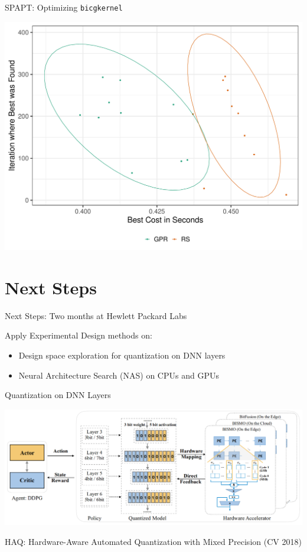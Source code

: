 \documentclass[10pt, compress, aspectratio=169, xcolor={table,usenames,dvipsnames}]{beamer}
\begin{document}
\begin{frame}[label={sec:org88dae01},fragile]{SPAPT: Optimizing \texttt{bicgkernel}}
 \begin{center}
\begin{center}
\includegraphics[width=.7\columnwidth]{../../../img/updated_bicgkernel.pdf}
\end{center}
\end{center}
\end{frame}
\section{Next Steps}
\label{sec:org90dc29b}
\begin{frame}[label={sec:org30ac61a}]{Next Steps: Two months at Hewlett Packard Labs}
\begin{block}{Apply Experimental Design methods on:}
\begin{itemize}
\item Design space exploration for \alert{quantization} on DNN layers
\item Neural Architecture Search (\alert{NAS}) on CPUs and GPUs
\end{itemize}
\end{block}
\end{frame}
\begin{frame}[label={sec:orgae31bb9}]{Quantization on DNN Layers}
\begin{center}
\includegraphics[width=\columnwidth]{../../../img/haq_quantization.png}
\end{center}

\begin{center}
\scriptsize{HAQ: Hardware-Aware Automated Quantization with Mixed Precision (CV 2018)}
\end{center}
\end{frame}
\end{document}
